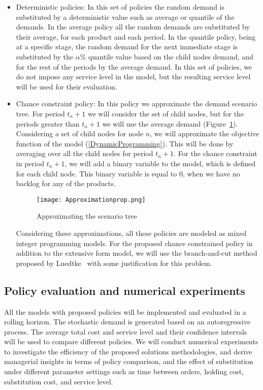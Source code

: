 \documentclass[10pt]{article}
\newcommand{\ti}{t} %
\begin{document}
    \begin{itemize}
        \item Deterministic policies: In this set of policies the random demand is substituted by a deterministic value such as average or quantile of the demands. In the average policy all the random demands are substituted by their average, for each product and each period. In the quantile policy, being at a specific stage, the random demand for the next immediate stage is substituted by the $\alpha\%$ quantile value based on the child nodes demand, and for the rest of the periods by the average demand. In this set of policies, we do not impose any service level in the model, but the resulting service level will be used for their evaluation.
        \item Chance constraint policy: In this policy we approximate the demand scenario tree. For period $\ti _n +1$ we will consider the set of child nodes, but for the periods greater than $\ti _n +1$ we will use the average demand (Figure~\ref{fig:Appr}). 
        Considering a set of child nodes for node $n$, we will approximate the objective function of the model (\ref{DynamicProgramming}). This will be done by averaging over all the child nodes for period $\ti _n +1$. For the chance constraint in period $\ti _n +1$, we will add a binary variable to the model, which is defined for each child node. This binary variable is equal to 0, when we have no backlog for any of the products.   
        \begin{figure}[!h]
\begin{center}
\texttt{[image: Approximationprop.png]}
\caption{Approximating the scenario tree} 
\label{fig:Appr}
\end{center}
\end{figure}
Considering these approximations, all these policies are modeled as mixed integer programming models. For the proposed chance constrained policy in addition to the extensive form model, we will use the branch-and-cut method proposed by Luedtke~\cite{luedtke2014branch} with some justification for this problem.
 \end{itemize}
  \subsection{Policy evaluation and numerical experiments}
All the models with proposed policies will be implemented and evaluated in a rolling horizon. The stochastic demand is generated based on an autoregressive process. The average total cost and service level and their confidence intervals will be used to compare different policies. We will conduct numerical experiments to investigate the efficiency of the proposed solutions methodologies, and derive managerial insights in terms of policy comparison, and the effect of substitution under different parameter settings such as time between orders, holding cost, substitution cost, and service level.
\end{document}
